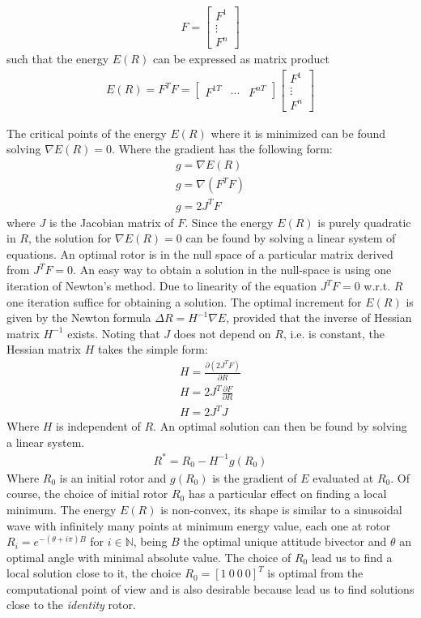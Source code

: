 \documentclass{birkjour}
\numberwithin{equation}{section}
\begin{document}
\begin{eqnarray*}
F = \left[\begin{array}{c}F^1 \\ \vdots \\ F^n\end{array}\right]
\end{eqnarray*}
 such that the energy $E(R)$ can be expressed as matrix product
\begin{eqnarray*}
E(R) = F^T F =
\left[\begin{array}{ccc}F^{1T} & \cdots & F^{nT}\end{array}\right]
\left[\begin{array}{c}F^1 \\ \vdots \\ F^n\end{array}\right]
\end{eqnarray*}

The critical points of the energy $E(R)$ where it is minimized can be found solving $\nabla E(R) = 0$. Where the gradient has the following form:
\begin{eqnarray*}
g = \nabla E(R)\\
g = \nabla (F^T F)\\
g = 2 J^T F
\end{eqnarray*}
where $J$ is the Jacobian matrix of $F$. Since the energy $E(R)$ is purely quadratic in $R$, the solution for $\nabla E(R) = 0$ can be found by solving a linear system of equations. An optimal rotor is in the null space of a particular matrix derived from $J^T F = 0$. An easy way to obtain a solution in the null-space is using one iteration of Newton's method. Due to linearity of the equation $J^T F = 0$ w.r.t. $R$ one iteration suffice for obtaining a solution. The optimal increment for $E(R)$ is given by the Newton formula $\Delta R = H^{-1} \nabla E$, provided that the inverse of Hessian matrix $H^{-1}$ exists. Noting that $J$ does not depend on $R$, i.e. is constant, the Hessian matrix $H$ takes the simple form:
\begin{eqnarray*}
H = \frac{\partial(2 J^T F)}{\partial R} \\
H = 2 J^T \frac{\partial F}{\partial R}\\
H = 2 J^T J
\end{eqnarray*}
Where $H$ is independent of $R$. An optimal solution can then be found by solving a linear system.
\begin{eqnarray*}
R^* = R_0 - H^{-1} g(R_0)
\end{eqnarray*}
Where $R_0$ is an initial rotor and $g(R_0)$ is the gradient of $E$ evaluated at $R_0$. Of course, the choice of initial rotor $R_0$ has a particular effect on finding a local minimum. The energy $E(R)$ is non-convex, its shape is similar to a sinusoidal wave with infinitely many points at minimum energy value, each one at rotor $R_i = e^{-(\theta + i \pi) B}$ for $i \in \mathbb N$, being $B$ the optimal unique attitude bivector and $\theta $ an optimal angle with minimal absolute value. The choice of $R_0$ lead us to find a local solution close to it, the choice $R_0 = [1 \ 0 \ 0 \ 0]^T$ is optimal from the computational point of view and is also desirable because lead us to find solutions close to the \emph{identity} rotor. 
\end{document}
